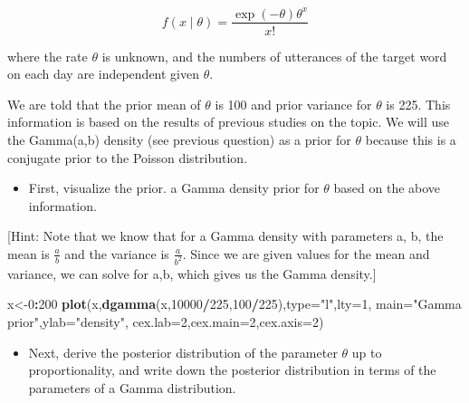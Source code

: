\documentclass[12pt,]{krantz}
\newenvironment{Shaded}{\begin{snugshade}}{\end{snugshade}}
\newcommand{\DataTypeTok}[1]{\textcolor[rgb]{0.13,0.29,0.53}{#1}}
\newcommand{\DecValTok}[1]{\textcolor[rgb]{0.00,0.00,0.81}{#1}}
\newcommand{\KeywordTok}[1]{\textcolor[rgb]{0.13,0.29,0.53}{\textbf{#1}}}
\newcommand{\NormalTok}[1]{#1}
\newcommand{\OperatorTok}[1]{\textcolor[rgb]{0.81,0.36,0.00}{\textbf{#1}}}
\newcommand{\StringTok}[1]{\textcolor[rgb]{0.31,0.60,0.02}{#1}}
\providecommand{\tightlist}{%
  \setlength{\itemsep}{0pt}\setlength{\parskip}{0pt}}
\begin{document}
\begin{equation}
f(x\mid \theta) = \frac{\exp(-\theta) \theta^x}{x!}
\end{equation}

where the rate \(\theta\) is unknown, and the numbers of utterances of the target word on each day are independent given \(\theta\).

We are told that the prior mean of \(\theta\) is 100 and prior variance for \(\theta\) is 225. This information is based on the results of previous studies on the topic. We will use the Gamma(a,b) density (see previous question) as a prior for \(\theta\) because this is a conjugate prior to the Poisson distribution.

\begin{itemize}
\tightlist
\item
  First, visualize the prior. a Gamma density prior for \(\theta\) based on the above information.
\end{itemize}

{[}Hint: Note that we know that for a Gamma density with parameters a, b, the mean is \(\frac{a}{b}\) and the variance is \(\frac{a}{b^2}\). Since we are given values for the mean and variance, we can solve for a,b, which gives us the Gamma density.{]}

\begin{Shaded}
\begin{Highlighting}[]
\NormalTok{x<-}\DecValTok{0}\OperatorTok{:}\DecValTok{200}
\KeywordTok{plot}\NormalTok{(x,}\KeywordTok{dgamma}\NormalTok{(x,}\DecValTok{10000}\OperatorTok{/}\DecValTok{225}\NormalTok{,}\DecValTok{100}\OperatorTok{/}\DecValTok{225}\NormalTok{),}\DataTypeTok{type=}\StringTok{"l"}\NormalTok{,}\DataTypeTok{lty=}\DecValTok{1}\NormalTok{,}
     \DataTypeTok{main=}\StringTok{"Gamma prior"}\NormalTok{,}\DataTypeTok{ylab=}\StringTok{"density"}\NormalTok{,}
     \DataTypeTok{cex.lab=}\DecValTok{2}\NormalTok{,}\DataTypeTok{cex.main=}\DecValTok{2}\NormalTok{,}\DataTypeTok{cex.axis=}\DecValTok{2}\NormalTok{)}
\end{Highlighting}
\end{Shaded}

\begin{itemize}
\tightlist
\item
  Next, derive the posterior distribution of the parameter \(\theta\) up to proportionality, and write down the posterior distribution in terms of the parameters of a Gamma distribution.
\end{itemize}
\end{document}
